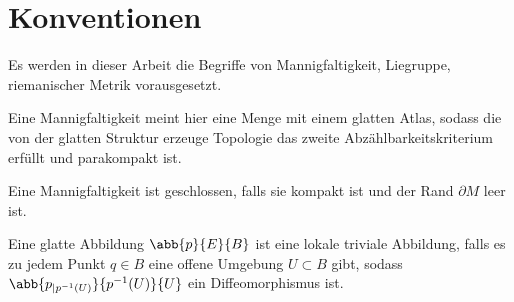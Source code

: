 


\section{Konventionen}
Es werden in dieser Arbeit die Begriffe von Mannigfaltigkeit, Liegruppe,
riemanischer Metrik vorausgesetzt.

Eine Mannigfaltigkeit meint hier eine Menge mit einem glatten Atlas, sodass die von der glatten Struktur erzeuge Topologie das zweite Abzählbarkeitskriterium erfüllt und parakompakt ist.

Eine Mannigfaltigkeit ist geschlossen, falls sie kompakt ist und
der Rand $ \partial M  $ leer ist.

Eine glatte Abbildung $ \abb{p}{E}{B} $ ist
eine lokale triviale Abbildung, falls es zu jedem
Punkt $ q\in B $ eine offene Umgebung $ U\subset B $ gibt, sodass $ \abb{p_{|p^{-1}(U)}}{p^{-1}(U)}{U} $ ein Diffeomorphismus ist.



%
%
%
%
%
%
%


